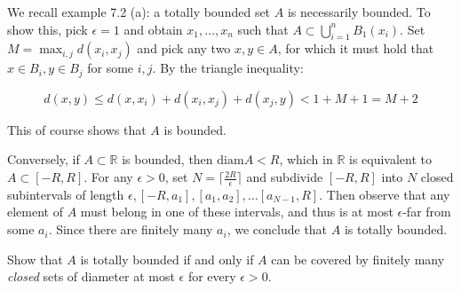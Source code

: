 \begin{solution}

    We recall example 7.2 (a): a totally bounded set $A$ is necessarily bounded.
    To show this, pick $\epsilon = 1$ and obtain $x_1, \ldots, x_n$ such that $A \subset \bigcup_{i=1}^{n} B_1(x_i)$.
    Set $M = \max_{i, j} d(x_i, x_j)$ and pick any two $x, y \in A$, for which it must hold that $x \in B_i, y \in B_j$ for some $i, j$.
    By the triangle inequality:

    \[d(x, y) \leq d(x, x_i) + d(x_i, x_j) + d(x_j, y) < 1 + M + 1 = M + 2\]

    This of course shows that $A$ is bounded.
    
    Conversely, if $A \subset \mathbb{R}$ is bounded, then $\text{diam} A < R$, which in $\mathbb{R}$ is equivalent to $A \subset [-R, R]$.
    For any $\epsilon > 0$, set $N = \lceil \frac{2R}{\epsilon} \rceil$ and subdivide $[-R, R]$ into $N$ closed subintervals of length $\epsilon, [-R, a_1], [a_1, a_2], \ldots [a_{N-1}, R]$.
    Then observe that any element of $A$ must belong in one of these intervals, and thus is at most $\epsilon$-far from some $a_i$.
    Since there are finitely many $a_i$, we conclude that $A$ is totally bounded.
\end{solution}

\begin{exercise}{4}
    Show that $A$ is totally bounded if and only if $A$ can be covered by finitely many \textit{closed} sets of diameter at most $\epsilon$ for every $\epsilon > 0$.
\end{exercise}


